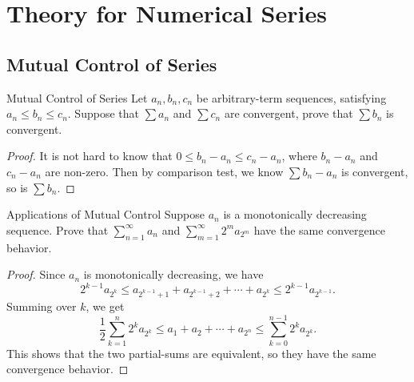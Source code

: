 \section{Theory for Numerical Series}

\subsection{Mutual Control of Series}

\begin{proposition}{Mutual Control of Series}{}
  Let $a_n, b_n, c_n$ be arbitrary-term sequences,
  satisfying $a_n \leq b_n \leq c_n$.
  Suppose that $\sum a_n$ and $\sum c_n$ are convergent,
  prove that $\sum b_n$ is convergent.
\end{proposition}

\begin{proof}
  It is not hard to know that $0 \leq b_n - a_n \leq c_n - a_n$,
  where $b_n - a_n$ and $c_n - a_n$ are non-zero.
  Then by comparison test, we know $\sum b_n - a_n$ is convergent,
  so is $\sum b_n$.
\end{proof}

\begin{example}{Applications of Mutual Control}{}
  Suppose $a_n$ is a monotonically decreasing sequence.
  Prove that $\sum\limits_{n = 1}^{\infty} a_n$ and $\sum\limits_{m =
    1}^{\infty} 2^m a_{2^m}$ have the same convergence behavior.
\end{example}

\begin{proof}
  Since $a_n$ is monotonically decreasing, we have
  \begin{equation}
    2^{k-1}a_{2^k} \leq a_{2^{k-1} + 1} + a_{2^{k-1} + 2} + \cdots + a_{2^k}
    \leq 2^{k-1}a_{2^{k-1}}.
  \end{equation}
  Summing over $k$, we get
  \begin{equation}
    \frac{1}{2} \sum\limits_{k = 1}^n 2^ka_{2^k}
    \leq a_1 + a_2 + \cdots + a_{2^n}
    \leq \sum\limits_{k = 0}^{n-1}2^ka_{2^k}.
  \end{equation}
  This shows that the two partial-sums are equivalent,
  so they have the same convergence behavior.
\end{proof}



